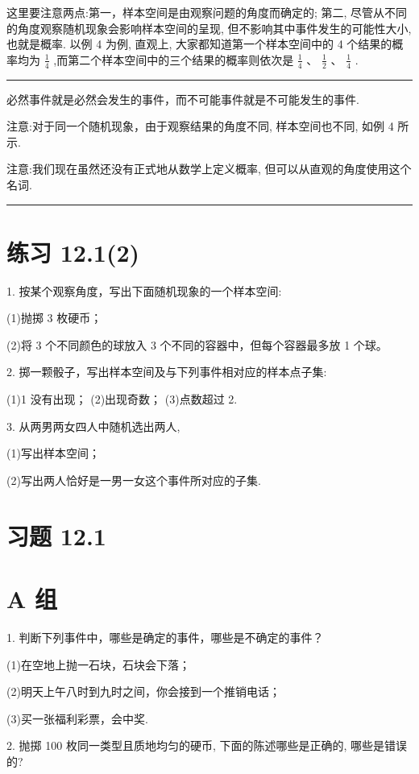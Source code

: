 \documentclass[10pt]{article}
\newcommand{\HRule}{\begin{center}\rule{0.9\linewidth}{0.2mm}\end{center}}
\begin{document}
这里要注意两点:第一，样本空间是由观察问题的角度而确定的; 第二, 尽管从不同的角度观察随机现象会影响样本空间的呈现, 但不影响其中事件发生的可能性大小, 也就是概率. 以例 4 为例, 直观上, 大家都知道第一个样本空间中的 4 个结果的概率均为 \(\frac{1}{4}\) ,而第二个样本空间中的三个结果的概率则依次是 \(\frac{1}{4}\) 、 \(\frac{1}{2}\text{ 、 }\frac{1}{4}\) .

\HRule

必然事件就是必然会发生的事件，而不可能事件就是不可能发生的事件.

注意:对于同一个随机现象，由于观察结果的角度不同, 样本空间也不同, 如例 4 所示.

注意:我们现在虽然还没有正式地从数学上定义概率, 但可以从直观的角度使用这个名词.

\HRule

\section*{练习 12.1(2)}

1. 按某个观察角度，写出下面随机现象的一个样本空间:

(1)抛掷 3 枚硬币；

(2)将 3 个不同颜色的球放入 3 个不同的容器中，但每个容器最多放 1 个球。

2. 掷一颗骰子，写出样本空间及与下列事件相对应的样本点子集:

(1)1 没有出现； (2)出现奇数； (3)点数超过 2.

3. 从两男两女四人中随机选出两人,

(1)写出样本空间；

(2)写出两人恰好是一男一女这个事件所对应的子集.

\section*{习题 12.1}

\section*{A 组}

1. 判断下列事件中，哪些是确定的事件，哪些是不确定的事件？

(1)在空地上抛一石块，石块会下落；

(2)明天上午八时到九时之间，你会接到一个推销电话；

(3)买一张福利彩票，会中奖.

2. 抛掷 100 枚同一类型且质地均匀的硬币, 下面的陈述哪些是正确的, 哪些是错误的?
\end{document}
